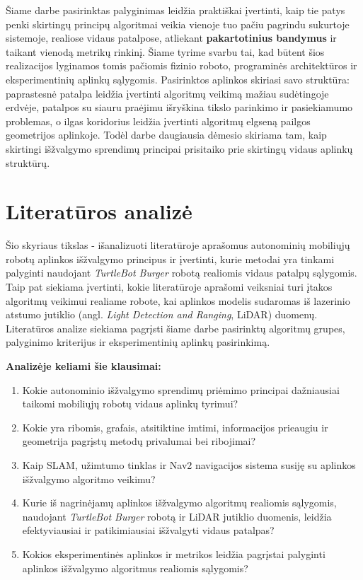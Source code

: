 \documentclass[]{VUMIFTemplateClass}
\begin{document}
Šiame darbe pasirinktas palyginimas leidžia praktiškai įvertinti, kaip tie patys penki skirtingų principų algoritmai veikia vienoje tuo pačiu pagrindu sukurtoje sistemoje, realiose vidaus patalpose, atliekant \textbf{pakartotinius bandymus} ir taikant vienodą metrikų rinkinį. Šiame tyrime svarbu
  tai, kad būtent šios realizacijos lyginamos tomis pačiomis fizinio roboto, programinės architektūros ir eksperimentinių aplinkų sąlygomis. Pasirinktos
  aplinkos skiriasi savo struktūra: paprastesnė patalpa leidžia įvertinti algoritmų veikimą mažiau sudėtingoje erdvėje, patalpos su siauru praėjimu išryškina
  tikslo parinkimo ir pasiekiamumo problemas, o ilgas koridorius leidžia įvertinti algoritmų elgseną pailgos geometrijos aplinkoje. Todėl darbe daugiausia
  dėmesio skiriama tam, kaip skirtingi išžvalgymo sprendimų principai prisitaiko prie skirtingų vidaus aplinkų struktūrų.

\section[LITERATŪROS ANALIZĖ]{Literatūros analizė}

Šio skyriaus tikslas - išanalizuoti literatūroje aprašomus autonominių mobiliųjų robotų aplinkos išžvalgymo principus ir įvertinti, kurie metodai yra tinkami
palyginti naudojant \textit{TurtleBot Burger} robotą realiomis vidaus patalpų sąlygomis. Taip pat siekiama įvertinti, kokie literatūroje aprašomi veiksniai
turi įtakos algoritmų veikimui realiame robote, kai aplinkos modelis sudaromas iš lazerinio atstumo jutiklio (angl. \textit{Light Detection and Ranging}, LiDAR) duomenų. Literatūros analize siekiama pagrįsti
šiame darbe pasirinktų algoritmų grupes, palyginimo kriterijus ir eksperimentinių aplinkų pasirinkimą.

\textbf{Analizėje keliami šie klausimai:}
\begin{enumerate}
  \item Kokie autonominio išžvalgymo sprendimų priėmimo principai dažniausiai taikomi mobiliųjų robotų vidaus aplinkų tyrimui?
  \item Kokie yra ribomis, grafais, atsitiktine imtimi, informacijos prieaugiu ir geometrija pagrįstų metodų privalumai bei ribojimai?
  \item Kaip SLAM, užimtumo tinklas ir Nav2 navigacijos sistema susiję su aplinkos išžvalgymo algoritmo veikimu?
  \item Kurie iš nagrinėjamų aplinkos išžvalgymo algoritmų realiomis sąlygomis, naudojant \textit{TurtleBot Burger} robotą ir LiDAR jutiklio
   duomenis, leidžia efektyviausiai ir patikimiausiai išžvalgyti vidaus patalpas?
  \item Kokios eksperimentinės aplinkos ir metrikos leidžia pagrįstai palyginti aplinkos išžvalgymo algoritmus realiomis sąlygomis?
\end{enumerate}
\end{document}

